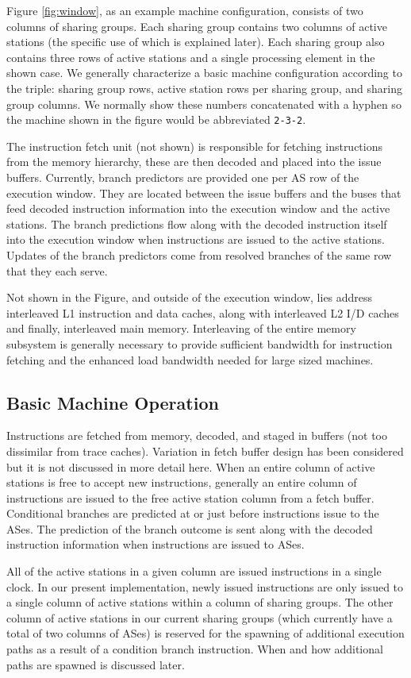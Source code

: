 \documentclass[10pt,dvips]{article}
\begin{document}
Figure \ref{fig:window}, as an example machine configuration, consists of 
two columns of sharing groups.  Each sharing group contains two columns of
active stations (the specific use of which is explained later).
Each sharing group also contains three rows of active stations
and a single processing element in the shown case.  
We generally characterize
a basic machine configuration according to the triple: sharing group
rows, active station
rows per sharing group, and sharing group columns.  We normally
show these numbers concatenated with a hyphen so the machine shown
in the figure would be abbreviated {\tt 2-3-2}.

The instruction fetch unit (not shown) is responsible for
fetching instructions from the memory hierarchy, these are then decoded
and placed into the issue buffers.   
Currently, branch predictors are provided one per AS row of the execution
window.  
They are located between the issue buffers and the buses that feed
decoded instruction information into the execution window and the
active stations.  
The branch predictions flow along with
the decoded instruction itself into the
execution window when instructions are issued to the active stations.
Updates of the branch predictors come from resolved branches
of the same row that they each serve.

Not shown in the Figure, and outside of the execution window,
lies address interleaved L1 instruction and data caches, along with
interleaved L2 I/D caches and finally, interleaved main memory.
Interleaving of the entire memory subsystem is generally necessary
to provide sufficient bandwidth for instruction fetching and the
enhanced load bandwidth needed for large sized machines.
%
\subsection{Basic Machine Operation}
%
Instructions are fetched from memory, decoded, and staged in buffers
(not too dissimilar from trace caches).  Variation in fetch buffer
design has been considered but it is not discussed in more detail here.
When an entire column
of active stations is free to accept new instructions, generally
an entire column of instructions are issued to the free active station
column from a fetch buffer.
Conditional branches are
predicted at or just before instructions issue to the ASes.
The prediction of the branch outcome 
is sent along with the
decoded instruction information when instructions are issued to
ASes.

All of the active stations in a given column are issued instructions
in a single clock.  
In our present implementation, newly issued instructions
are only issued to a single column of active stations within
a column of sharing groups.  The other column of active stations
in our current sharing groups (which currently have a total
of two columns of ASes) is reserved for the spawning of additional
execution paths as a result of a condition branch instruction.
When and how additional paths are spawned is discussed later.
\end{document}
